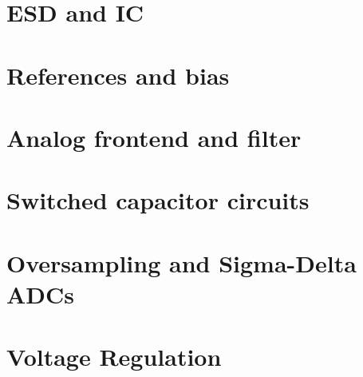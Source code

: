 \documentclass[11pt,twoside,openright]{book}
\begin{document}
\chapter{ESD and IC}


\chapter{References and bias}


\chapter{Analog frontend and filter}


\chapter{Switched capacitor circuits}


\chapter{Oversampling and Sigma-Delta ADCs}


\chapter{Voltage Regulation}


%

%

%

%

%

%


%


\backmatter
\end{document}
